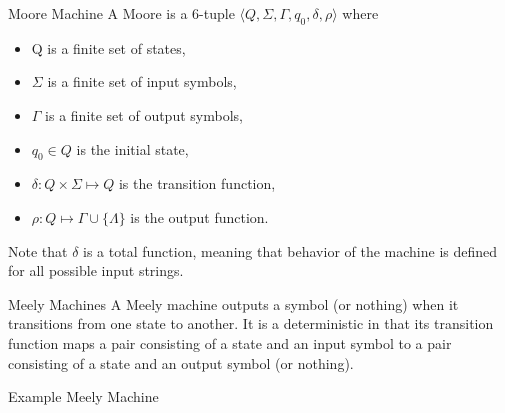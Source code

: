 \documentclass{beamer}
\begin{document}
\begin{frame}{Moore Machine}
A Moore is a 6-tuple $\langle Q, \Sigma, \Gamma, q_0, \delta,\rho\rangle$ where
\begin{itemize}
  \item Q is a finite set of states,
  \item $\Sigma$ is a finite set of input symbols,
  \item $\Gamma$ is a finite set of output symbols,
  \item $q_0\in Q$ is  the initial state,
  \item $\delta:Q\times \Sigma\mapsto Q$ is  the transition function,
  \item $\rho: Q \mapsto\Gamma\cup\{\Lambda\}$ is the output function. 
\end{itemize}
Note that $\delta$ is a total function,
meaning that behavior of the machine is defined
for all possible input strings. 
\end{frame}

\begin{frame}{Meely Machines}
A Meely machine outputs a symbol (or nothing) when it transitions from one state to another. 
It is a deterministic in that its transition function maps 
a pair consisting of a state and an input symbol to a pair consisting of a state and an output symbol (or nothing).  
\end{frame}

\begin{frame}{Example Meely Machine}
\begin{center}
%
\end{center}
\end{frame}
\end{document}
